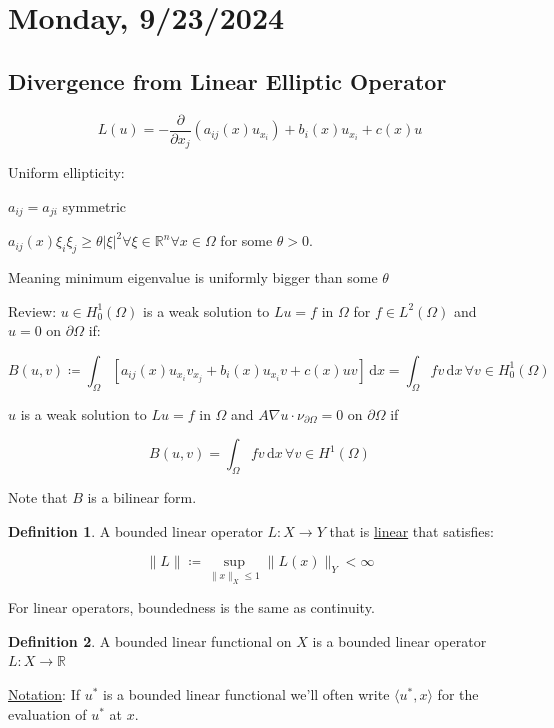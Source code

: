 \documentclass{article}
\theoremstyle{definition}
\newtheorem{definition}{Definition}
\begin{document}
\section*{Monday, 9/23/2024}

\subsection*{Divergence from Linear Elliptic Operator}

\[
    L(u) = - \frac{\partial}{\partial x_j} (a_{ij}(x)u_{x_i}) + b_i(x)u_{x_i}+ c(x)u
\]

Uniform ellipticity:

\(a_{ij} = a_{ji}\) symmetric

\(a_{ij}(x) \xi_i \xi_j \geq \theta \vert \xi \vert ^2 \forall \xi \in \mathbb{R}^n \forall x\in \Omega\) for some \(\theta > 0\).

Meaning minimum eigenvalue is uniformly bigger than some \(\theta\) 

Review: \(u\in H^1_0(\Omega)\) is a weak solution to \(Lu=f\) in \(\Omega\) for \(f\in L^2(\Omega)\) and \(u=0\) on \(\partial \Omega\) if:

\[
    B(u,v) \coloneqq \int_{\Omega}^{} \left[ a_{ij}(x) u_{x_i}v_{x_j} + b_i(x)u_{x_i}v + c(x)uv \right]  \,\mathrm{d}x = \int_{\Omega}^{} fv \,\mathrm{d}x \, \forall v\in H^1_0 (\Omega)
\]

\(u\) is a weak solution to \(Lu = f\) in \(\Omega\) and \(A \nabla u \cdot \nu_{\partial \Omega} = 0\) on \(\partial \Omega\) if 

\[
    B(u,v) = \int_{\Omega}^{} fv \,\mathrm{d}x \, \forall v\in H^1(\Omega)
\]

Note that \(B\) is a bilinear form.

\begin{definition}
    A bounded linear operator \(L: X \to Y\) that is \underline{linear} that satisfies:

    \[
        \lVert L \rVert \coloneqq \sup_{\lVert x \rVert _X \leq 1} \lVert L(x) \rVert _Y < \infty
    \]
\end{definition}

For linear operators, boundedness is the same as continuity.

\begin{definition}
    A bounded linear functional on \(X\) is a bounded linear operator \(L : X \to \mathbb{R}\) 
\end{definition}

\underline{Notation}: If \(u^{\ast}\) is a bounded linear functional we'll often write \(\langle u^{\ast} , x \rangle \) for the evaluation of \(u^{\ast}\) at \(x\).
\end{document}
